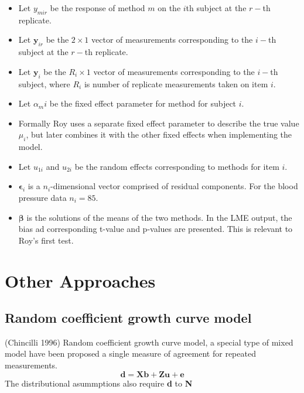 \documentclass[12pt, a4paper]{report}
\theoremstyle{plain}
\theoremstyle{definition}
\theoremstyle{remark}
\begin{document}
\begin{itemize}
	\item Let $y_{mir}$ be the response of method $m$ on the $i$th subject
	at the $r-$th replicate.
	\item Let $\boldsymbol{y}_{ir}$ be the $2 \times 1$ vector of measurements
	corresponding to the $i-$th subject at the $r-$th replicate.
	\item Let $\boldsymbol{y}_{i}$ be the $R_i \times 1$ vector of
	measurements corresponding to the $i-$th subject, where $R_i$ is number of replicate measurements taken on item $i$.
	\item Let $\alpha_mi$ be the fixed effect parameter for method for subject $i$.
	\item Formally Roy uses a separate fixed effect parameter to describe the true value $\mu_i$, but later combines it with the other fixed effects when implementing the model.
	\item Let $u_{1i}$ and $u_{2i}$ be the random effects corresponding to methods for item $i$.
	
	\item $\boldsymbol{\epsilon}_{i}$ is a $n_{i}$-dimensional vector
	comprised of residual components. For the blood pressure data $n_{i} = 85$.
	
	\item $\boldsymbol{\beta}$ is the solutions of the means of the two methods. In the LME output, the bias ad corresponding
	t-value and p-values are presented. This is relevant to Roy's first test.\end{itemize}

\section{Other Approaches}

\subsection{Random coefficient growth curve model} (Chincilli
1996) Random coefficient growth curve model, a special type of
mixed model have been proposed a single measure of agreement for
repeated measurements.
\begin{equation}
\textbf{d}= \textbf{Xb} + \textbf{Zu} + \textbf{e}
\end{equation}
The distributional asummptions also require \textbf{d} to
\textbf{N}
\end{document}
